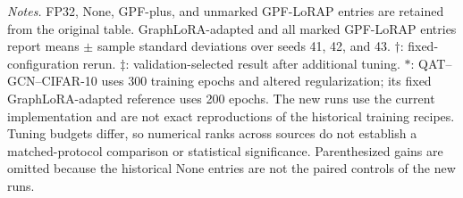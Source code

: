 \begin{table}[t]
\begin{minipage}{\textwidth}
\scriptsize
\textit{Notes.} FP32, None, GPF-plus, and unmarked GPF-LoRAP entries are retained from the original table.
GraphLoRA-adapted and all marked GPF-LoRAP entries report means $\pm$ sample standard deviations over seeds 41, 42, and 43.
$\dagger$: fixed-configuration rerun. $\ddagger$: validation-selected result after additional tuning.
$*$: QAT--GCN--CIFAR-10 uses 300 training epochs and altered regularization; its fixed GraphLoRA-adapted reference uses 200 epochs.
The new runs use the current implementation and are not exact reproductions of the historical training recipes.
Tuning budgets differ, so numerical ranks across sources do not establish a matched-protocol comparison or statistical significance.
Parenthesized gains are omitted because the historical None entries are not the paired controls of the new runs.
\end{minipage}
\end{table}
